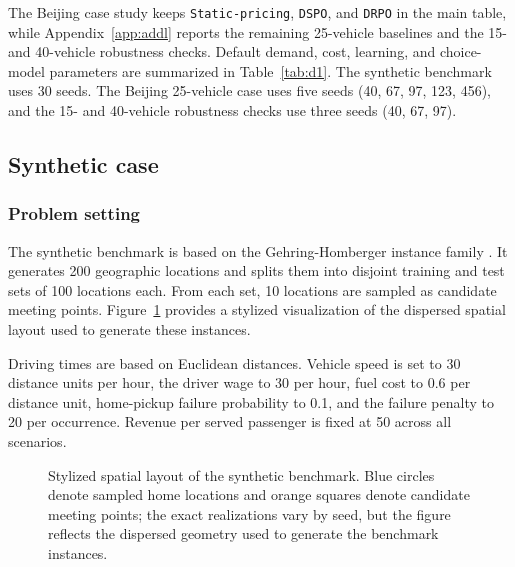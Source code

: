 \documentclass[preprint,12pt,authoryear]{elsarticle}
\begin{document}
The Beijing case study keeps \texttt{Static-pricing}, \texttt{DSPO}, and \texttt{DRPO} in the main table, while Appendix~\ref{app:addl} reports the remaining 25-vehicle baselines and the 15- and 40-vehicle robustness checks. Default demand, cost, learning, and choice-model parameters are summarized in Table~\ref{tab:d1}. The synthetic benchmark uses 30 seeds. The Beijing 25-vehicle case uses five seeds (40, 67, 97, 123, 456), and the 15- and 40-vehicle robustness checks use three seeds (40, 67, 97).

\subsection{Synthetic case}

\subsubsection{Problem setting}

The synthetic benchmark is based on the Gehring-Homberger instance family \citep{homberger2005}. It generates 200 geographic locations and splits them into disjoint training and test sets of 100 locations each. From each set, 10 locations are sampled as candidate meeting points. Figure~\ref{fig:synthetic-layout} provides a stylized visualization of the dispersed spatial layout used to generate these instances.

Driving times are based on Euclidean distances. Vehicle speed is set to 30 distance units per hour, the driver wage to 30 per hour, fuel cost to 0.6 per distance unit, home-pickup failure probability to 0.1, and the failure penalty to 20 per occurrence. Revenue per served passenger is fixed at 50 across all scenarios.

\begin{figure}[t]
\centering
{}
\caption{Stylized spatial layout of the synthetic benchmark. Blue circles denote sampled home locations and orange squares denote candidate meeting points; the exact realizations vary by seed, but the figure reflects the dispersed geometry used to generate the benchmark instances.}
\label{fig:synthetic-layout}
\end{figure}
\end{document}
